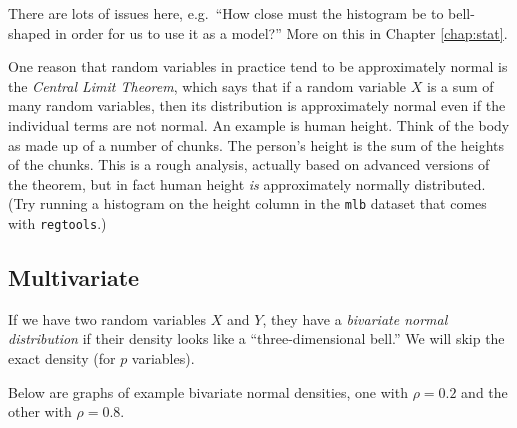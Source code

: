 There are lots of issues here, e.g.\ ``How close must the histogram
be to bell-shaped in order for us to use it as a model?''  More on this
in Chapter \ref{chap:stat}.

One reason that random variables in practice tend to be approximately
normal is the \textit{Central Limit Theorem}, which says that if a
random variable $X$ is a sum of many random variables, then its
distribution is approximately normal even if the individual terms are
not normal.  An example is human height.  Think of the body as made up
of a number of chunks.  The person's height is the sum of the heights of
the chunks.  This is a rough analysis, actually based on advanced
versions of the theorem, but in fact human height \textit{is}
approximately normally distributed.  (Try running a histogram on the
height column in the \lstinline{mlb} dataset that comes with
\lstinline{regtools}.)

\subsection{Multivariate}

If we have two random variables $X$ and $Y$, they have a
\textit{bivariate normal distribution} if their density looks like a
``three-dimensional bell.''  We will skip the exact density (for $p$
variables).

Below are graphs of example bivariate normal densities, one with $\rho =
0.2$ and the other with $\rho = 0.8$.

